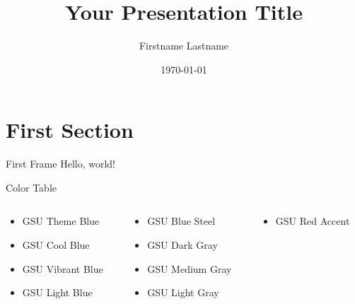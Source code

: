 \documentclass{beamer}
\title[A Short title]{Your Presentation Title}
\date{\today}
\author[F. L.]{Firstname Lastname}
\institute[GSU]{Georgia State University}
\begin{document}
	\begin{frame}
		\titlepage
	\end{frame}
	\begin{frame}
		\tableofcontents
	\end{frame}

	\section{First Section}
	\begin{frame}{First Frame}
		Hello, world!
	\end{frame}
	\begin{frame}{Color Table}
		
		\begin{columns}
			\begin{column}{0.33\textwidth}
				\begin{itemize}
					\item \textcolor{GSUThemeBlue}{GSU Theme Blue}
					\item \textcolor{GSUCoolBlue}{GSU Cool Blue}
					\item \textcolor{GSUVibrantBlue}{GSU Vibrant Blue}
					\item \textcolor{GSULightBlue}{GSU Light Blue}
				\end{itemize}
			\end{column}
			
			\begin{column}{0.33\textwidth}
				\begin{itemize}
					\item \textcolor{GSUBlueSteel}{GSU Blue Steel}
					\item \textcolor{GSUDarkGray}{GSU Dark Gray}
					\item \textcolor{GSUMediumGray}{GSU Medium Gray}
					\item \textcolor{GSULightGray}{GSU Light Gray}
				\end{itemize}
			\end{column}
		
			\begin{column}{0.33\textwidth}
				\begin{itemize}
					\item \textcolor{GSURedAccent}{GSU Red Accent}
				\end{itemize}
			\end{column}
		\end{columns}
		
	\end{frame}
	
\end{document}
